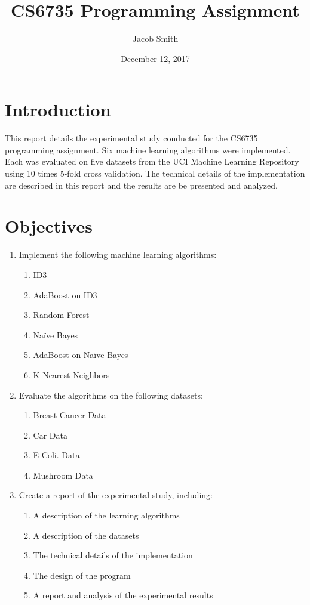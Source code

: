 \documentclass[11pt,titlepage]{article}
\title{CS6735 Programming Assignment}
\author{Jacob Smith}
\date{December 12, 2017}
\begin{document}
\maketitle

\section{Introduction}
This report details the experimental study conducted for the CS6735 programming assignment. Six machine learning algorithms were implemented. Each was evaluated on five datasets from the UCI Machine Learning Repository using 10 times 5-fold cross validation. The technical details of the implementation are described in this report and the results are be presented and analyzed.

\section{Objectives}
\begin{enumerate}
  \item Implement the following machine learning algorithms:
  \begin{enumerate}
    \item ID3
    \item AdaBoost on ID3
    \item Random Forest
    \item Naïve Bayes
    \item AdaBoost on Naïve Bayes
    \item K-Nearest Neighbors
  \end{enumerate}
  \item Evaluate the algorithms on the following datasets:
  \begin{enumerate}
    \item Breast Cancer Data
    \item Car Data
    \item E Coli. Data
    \item Mushroom Data
  \end{enumerate}
  \item Create a report of the experimental study, including:
  \begin{enumerate}
    \item A description of the learning algorithms
    \item A description of the datasets
    \item The technical details of the implementation
    \item The design of the program
    \item A report and analysis of the experimental results
  \end{enumerate}
\end{enumerate}
\end{document}
